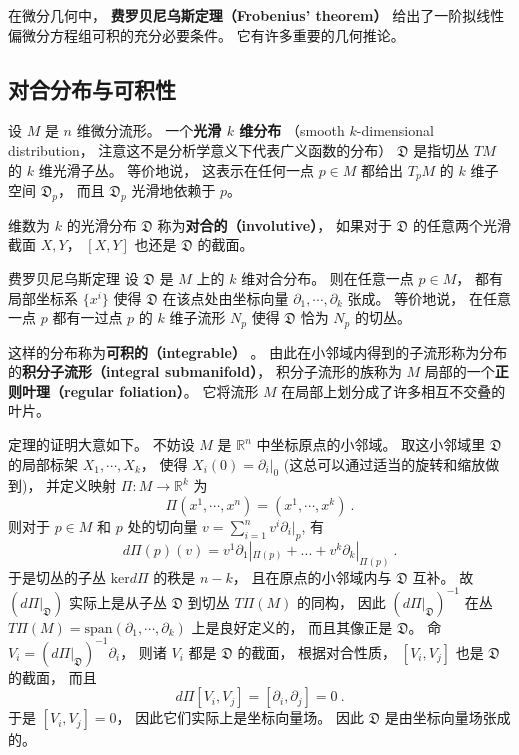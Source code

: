 

在微分几何中， \textbf{费罗贝尼乌斯定理（Frobenius' theorem）} 给出了一阶拟线性偏微分方程组可积的充分必要条件。 它有许多重要的几何推论。

\subsection{对合分布与可积性}
设 $M$ 是 $n$ 维微分流形。 一个\textbf{光滑 $k$ 维分布} （smooth $k$-dimensional distribution， 注意这不是分析学意义下代表广义函数的分布） $\mathfrak{D}$ 是指切丛 $TM$ 的 $k$ 维光滑子丛。 等价地说， 这表示在任何一点 $p\in M$ 都给出 $T_pM$ 的 $k$ 维子空间 $\mathfrak{D}_p$， 而且 $\mathfrak{D}_p$ 光滑地依赖于 $p$。

维数为 $k$ 的光滑分布 $\mathfrak{D}$ 称为\textbf{对合的（involutive）}， 如果对于 $\mathfrak{D}$ 的任意两个光滑截面 $X,Y$， $[X,Y]$ 也还是 $\mathfrak{D}$ 的截面。 

\begin{theorem}{费罗贝尼乌斯定理}
设 $\mathfrak{D}$ 是 $M$ 上的 $k$ 维对合分布。 则在任意一点 $p\in M$， 都有局部坐标系 $\{x^i\}$ 使得 $\mathfrak{D}$ 在该点处由坐标向量 $\partial_1,\cdots ,\partial_k$ 张成。 等价地说， 在任意一点 $p$ 都有一过点 $p$ 的 $k$ 维子流形 $N_p$ 使得 $\mathfrak{D}$ 恰为 $N_p$ 的切丛。
\end{theorem}
这样的分布称为\textbf{可积的（integrable）} 。 由此在小邻域内得到的子流形称为分布的\textbf{积分子流形（integral submanifold）}， 积分子流形的族称为 $M$ 局部的一个\textbf{正则叶理（regular foliation）}。 它将流形 $M$ 在局部上划分成了许多相互不交叠的叶片。

定理的证明大意如下。 不妨设 $M$ 是 $\mathbb{R}^n$ 中坐标原点的小邻域。 取这小邻域里 $\mathfrak{D}$ 的局部标架 $X_1,\cdots ,X_k$， 使得 $X_i(0)=\partial_i|_0$ (这总可以通过适当的旋转和缩放做到)， 并定义映射 $\Pi: M\to \mathbb{R}^k$ 为
$$
\Pi(x^1,\cdots ,x^n)=(x^1,\cdots ,x^k)~.
$$
则对于 $p\in M$ 和 $p$ 处的切向量 $v=\sum_{i=1}^nv^i\partial_i|_p$, 有
$$
d\Pi(p)(v)=v^1\partial_1|_{\Pi(p)}+...+v^k\partial_k|_{\Pi(p)}~.
$$
于是切丛的子丛 $\text{ker}d\Pi$ 的秩是 $n-k$， 且在原点的小邻域内与 $\mathfrak{D}$ 互补。 故 $(d\Pi|_{\mathfrak{D}})$ 实际上是从子丛 $\mathfrak{D}$ 到切丛 $T\Pi(M)$ 的同构， 因此 $(d\Pi|_{\mathfrak{D}})^{-1}$ 在丛 $T\Pi(M)=\text{span}(\partial_1,\cdots ,\partial_k)$ 上是良好定义的， 而且其像正是 $\mathfrak{D}$。 命 $V_i=(d\Pi|_{\mathfrak{D}})^{-1}\partial_i$， 则诸 $V_i$ 都是 $\mathfrak{D}$ 的截面， 根据对合性质， $[V_i,V_j]$ 也是 $\mathfrak{D}$ 的截面， 而且
$$
d\Pi[V_i,V_j]=[\partial_i,\partial_j]=0~.
$$
于是 $[V_i,V_j]=0$， 因此它们实际上是坐标向量场。 因此 $\mathfrak{D}$ 是由坐标向量场张成的。

